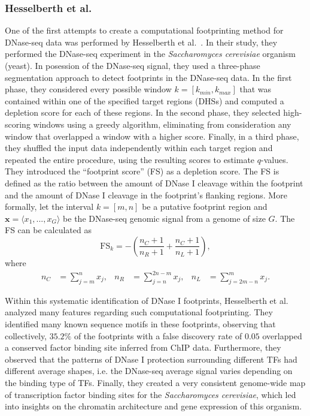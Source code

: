 \subsubsection{Hesselberth et al.}
\label{sec:hesselberth.2}

One of the first attempts to create a computational footprinting method for DNase-seq data was performed by Hesselberth et al.~\cite{hesselberth2009}. In their study, they performed the DNase-seq experiment in the \emph{Saccharomyces cerevisiae} organism (yeast). In posession of the DNase-seq signal, they used a three-phase segmentation approach to detect footprints in the DNase-seq data. In the first phase, they considered every possible window $k = [k_{min},k_{max}]$ that was contained within one of the specified target regions (DHSs) and computed a depletion score for each of these regions. In the second phase, they selected high-scoring windows using a greedy algorithm, eliminating from consideration any window that overlapped a window with a higher score. Finally, in a third phase, they shuffled the input data independently within each target region and repeated the entire procedure, using the resulting scores to estimate $q$-values. They introduced the ``footprint score'' (FS) as a depletion score. The FS is defined as the ratio between the amount of DNase I cleavage within the footprint and the amount of DNase I cleavage in the footprint's flanking regions. More formally, let the interval ${k} = [{m},{n}]$ be a putative footprint region and $\mathbf{x} = \langle  x_1, ..., x_G\rangle$ be the DNase-seq genomic signal from a genome of size $G$. The FS can be calculated as
\begin{equation}
  \label{eq:fs1}
  \text{FS}_{k} = -\left(\frac{{n}_{C}+1}{{n}_{R}+1} + \frac{{n}_{C}+1}{{n}_{L}+1}\right),
\end{equation}
where
\begin{align}
  \label{eq:fs2}
  {n}_{C} &= \sum_{j=m}^{n} {x}_{j}, &
  {n}_{R} &= \sum_{j=n}^{2n-m} {x}_{j}, &
  {n}_{L} &= \sum_{j=2m-n}^{m} {x}_{j}.
\end{align}

Within this systematic identification of DNase I footprints, Hesselberth et al.~\cite{hesselberth2009} analyzed many features regarding such computational footprinting. They identified many known sequence motifs in these footprints, observing that collectively, $35.2\%$ of the footprints with a false discovery rate of $0.05$ overlapped a conserved factor binding site inferred from ChIP data. Furthermore, they observed that the patterns of DNase I protection surrounding different TFs had different average shapes, i.e. the DNase-seq average signal varies depending on the binding type of TFs. Finally, they created a very consistent genome-wide map of transcription factor binding sites for the \emph{Saccharomyces cerevisiae}, which led into insights on the chromatin architecture and gene expression of this organism.

